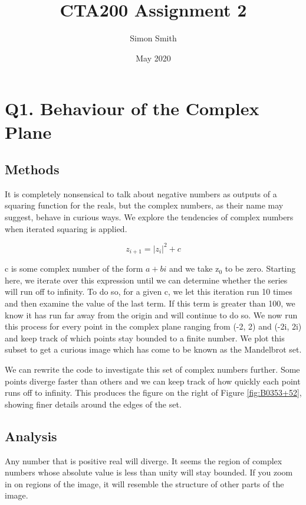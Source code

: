 \documentclass{article}
\title{CTA200 Assignment 2}
\author{Simon Smith}
\date{May 2020}
\begin{document}
\maketitle

\section{Q1. Behaviour of the Complex Plane}

\subsection{Methods}

It is completely nonsensical to talk about negative numbers as outputs of a squaring function for the reals, but the complex numbers, as their name may suggest, behave in curious ways. We explore the tendencies of complex numbers when iterated squaring is applied.

\begin{equation}
    z_{i+1} = |z_i|^2 + c
\end{equation}

c is some complex number of the form $a + bi$ and we take z$_0$ to be zero. Starting here, we iterate over this expression until we can determine whether the series will run off to infinity. To do so, for a given c, we let this iteration run 10 times and then examine the value of the last term. If this term is greater than 100, we know it has run far away from the origin and will continue to do so. We now run this process for every point in the complex plane ranging from (-2, 2) and (-2i, 2i) and keep track of which points stay bounded to a finite number. We plot this subset to get a curious image which has come to be known as the Mandelbrot set.

We can rewrite the code to investigate this set of complex numbers further. Some points diverge faster than others and we can keep track of how quickly each point runs off to infinity. This produces the figure on the right of Figure \ref{fig:B0353+52}, showing finer details around the edges of the set.

\subsection{Analysis}

Any number that is positive real will diverge. It seems the region of complex numbers whose absolute value is less than unity will stay bounded. If you zoom in on regions of the image, it will resemble the structure of other parts of the image.
\end{document}
